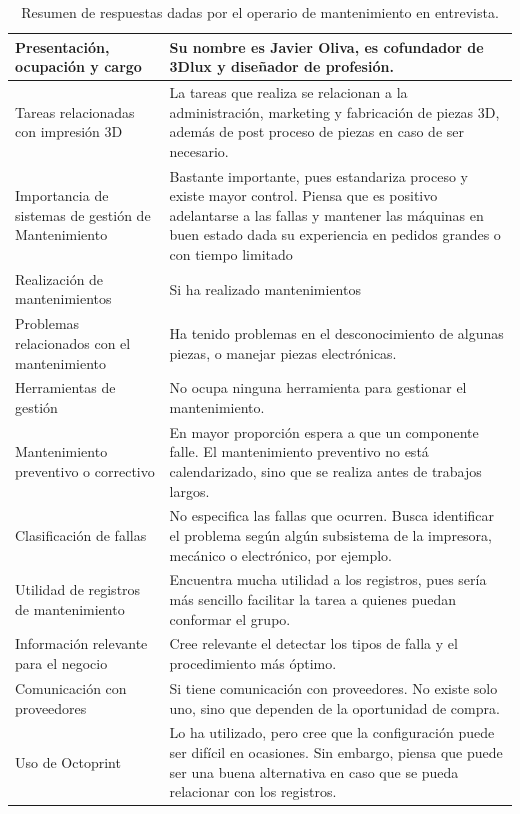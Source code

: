 \begin{table}[H]
\begin{tabular}{|p{5cm}|p{8cm}|}
\hline
Presentación, ocupación y cargo & Su nombre es Javier Oliva, es cofundador de 3Dlux y diseñador de profesión.  \\
\hline
Tareas relacionadas con impresión 3D & La tareas que realiza  se relacionan a la administración, marketing y fabricación de piezas 3D, además de post proceso de piezas en caso de ser necesario.\\
\hline 
Importancia de sistemas de gestión de Mantenimiento & Bastante importante, pues estandariza proceso y existe mayor control. Piensa que es positivo adelantarse a las fallas y mantener las máquinas en buen estado dada su experiencia en pedidos grandes o con tiempo limitado \\
\hline
Realización de mantenimientos & Si ha realizado mantenimientos \\ 
\hline
Problemas relacionados con el mantenimiento & Ha tenido problemas en el desconocimiento de algunas piezas, o manejar piezas electrónicas.\\
\hline
Herramientas de gestión & No ocupa ninguna herramienta para gestionar el mantenimiento. \\
\hline
Mantenimiento preventivo o correctivo & En mayor proporción espera a que un componente falle. El mantenimiento preventivo no está calendarizado, sino que se realiza antes de trabajos largos.\\
\hline
Clasificación de fallas & No especifica las fallas que ocurren. Busca identificar el problema según algún subsistema de la impresora, mecánico o electrónico, por ejemplo.\\
\hline
Utilidad de registros de mantenimiento & Encuentra mucha utilidad a los registros, pues sería más sencillo facilitar la tarea a quienes puedan conformar el grupo.\\
\hline
Información relevante para el negocio & Cree relevante el detectar los tipos de falla y el procedimiento más óptimo.\\
\hline
Comunicación con proveedores & Si tiene comunicación con proveedores. No existe solo uno, sino que dependen de la oportunidad de compra.\\
\hline
Uso de Octoprint & Lo ha utilizado, pero cree que la configuración puede ser difícil en ocasiones. Sin embargo, piensa que puede ser una buena alternativa en caso que se pueda relacionar con los registros.\\
\hline
\end{tabular}
\caption{Resumen de respuestas dadas por el operario de mantenimiento en entrevista.}
\end{table}







